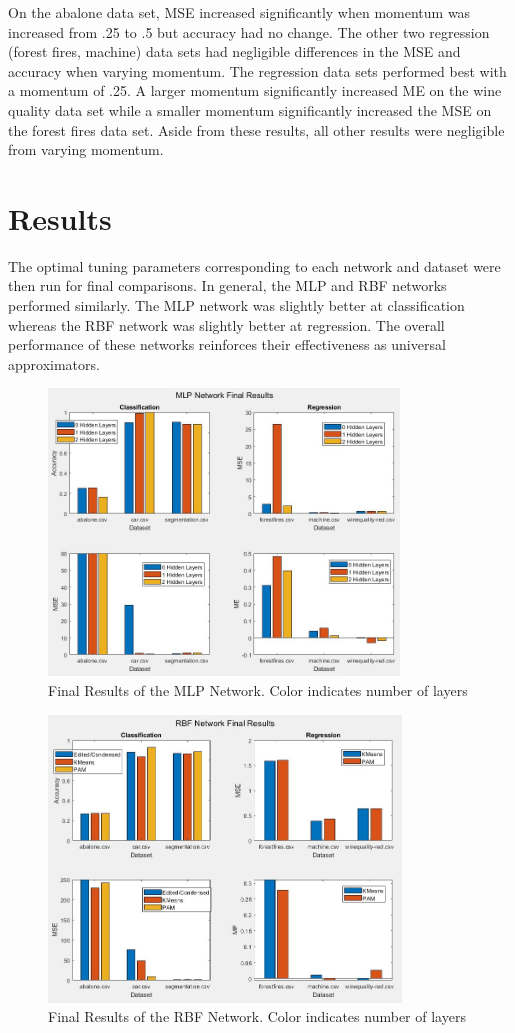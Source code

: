 \documentclass[twoside,11pt]{article}
\begin{document}
On the abalone data set, MSE increased significantly when momentum was increased from .25 to .5 but accuracy had no change. The other two regression (forest fires, machine) data sets had negligible differences in the MSE and accuracy when varying momentum. The regression data sets performed best with a momentum of .25. A larger momentum significantly increased ME on the wine quality data set while a smaller momentum significantly increased the MSE on the forest fires data set. Aside from these results, all other results were negligible from varying momentum.
\section{Results}

	The optimal tuning parameters corresponding to each network and dataset were then run for final comparisons. In general, the MLP and RBF networks performed similarly. The MLP network was slightly better at classification whereas the RBF network was slightly better at regression. The overall performance of these networks reinforces their effectiveness as universal approximators.

\begin{figure}[h]
	\centering
	\includegraphics[height=3in]{FINAL_FIGS/MLP_FINAL.JPG}
	\caption{Final Results of the MLP Network. Color indicates number of layers}
\end{figure}
\begin{figure}[h]
	\centering
	\includegraphics[height=3in]{FINAL_FIGS/RBF_FINAL.JPG}
	\caption{Final Results of the RBF Network. Color indicates number of layers}
\end{figure}
\end{document}
